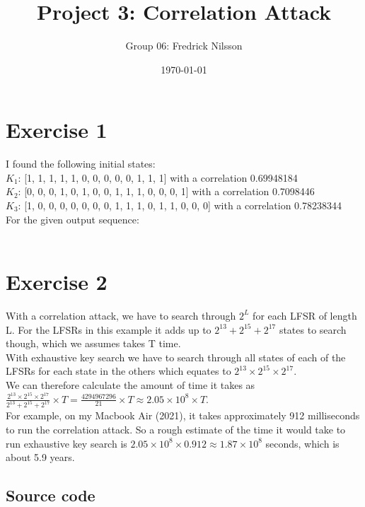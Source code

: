 \documentclass[12pt]{article}
\title{Project 3: Correlation Attack}
\author{Group 06: Fredrick Nilsson}
\date{\today}
\begin{document}
\maketitle

\newpage

\section*{Exercise 1}
I found the following initial states: \\
\(K_1\): [1, 1, 1, 1, 1, 0, 0, 0, 0, 0, 1, 1, 1] with a correlation 0.69948184\\
\(K_2\): [0, 0, 0, 1, 0, 1, 0, 0, 1, 1, 1, 0, 0, 0, 1] with a correlation 0.7098446\\
\(K_3\): [1, 0, 0, 0, 0, 0, 0, 0, 1, 1, 1, 0, 1, 1, 0, 0, 0] with a correlation 0.78238344\\
For the given output sequence: 
\\\\


\section*{Exercise 2}
With a correlation attack, we have to search through \(2^{L}\) for each LFSR of length L. For the LFSRs in this example it adds up to \(2^{13}+2^{15}+2^{17}\) states to search though, which we assumes takes T time.\\
With exhaustive key search we have to search through all states of each of the LFSRs for each state in the others which equates to \(2^{13} \times 2^{15} \times 2^{17}\).\\
We can therefore calculate the amount of time it takes as \(\frac{2^{13} \times 2^{15} \times 2^{17}}{2^{13}+2^{15}+2^{17}} \times  T = \frac{4294967296}{21}  \times  T \approx 2.05 \times 10^8 \times T \). \\
For example, on my Macbook Air (2021), it takes approximately 912 milliseconds to run the correlation attack. So a rough estimate of the time it would take to run exhaustive key search is \(2.05 \times 10^8 \times 0.912 \approx 1.87 \times 10^8\) seconds, which is about 5.9 years.\\


\subsection*{Source code}

\end{document}
